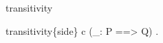 \begin{tactic}{transitivity}
  \begin{tsyntax}{transitivity\{side\} c (_: P ==> Q)}
  .
  \end{tsyntax}
\end{tactic}
